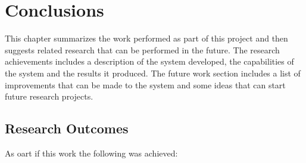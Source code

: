 \chapter{Conclusions}
\label{ch:conclusions}

This chapter summarizes the work performed as part of this project and then suggests related research that can be performed in the future. The research achievements includes a description of the system developed, the capabilities of the system and the results it produced. The future work section includes a list of improvements that can be made to the system and some ideas that can start future research projects.\\

\section{Research Outcomes}

As oart if this work the following was achieved:

